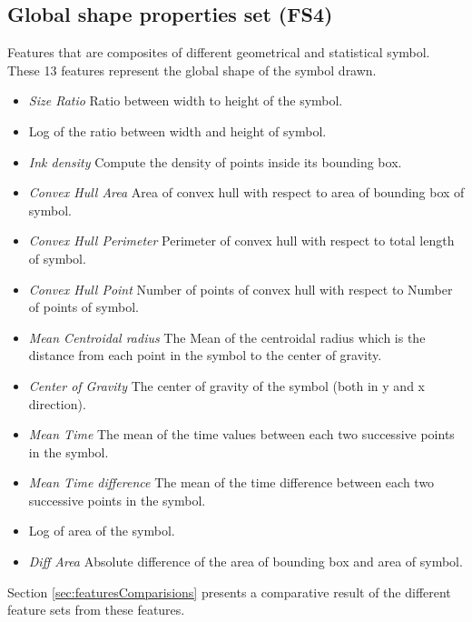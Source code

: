 \subsection{Global shape properties set (FS4)}
 Features that are composites of different geometrical and statistical symbol. These 13 features represent the global shape of the symbol drawn.

 	\begin{itemize}
\item \emph{Size Ratio} Ratio between width to height of the symbol.
		\item {} Log of the ratio between width and height of symbol.
	\item \emph{Ink density} Compute the density of points inside its bounding box\cite{GeometryAndDomain102}.   
 	\item \emph{Convex Hull Area} Area of convex hull with respect to area of bounding box of symbol.
  
	\item \emph{Convex Hull Perimeter} Perimeter of convex hull with respect to total length of symbol.
		\item \emph{Convex Hull Point} Number of points of convex hull with respect to Number of points of symbol.
		\item \emph{Mean Centroidal radius} The Mean of the centroidal radius which is the distance from each point in the symbol to the center of gravity.
				\item \emph{Center of Gravity} The center of gravity of the symbol (both in y and x direction).
					\item \emph{Mean Time} The mean of the time values between each two successive points in the symbol. %
				
	\item \emph{Mean Time difference} The mean of the time difference between each two successive points in the symbol. %
			\item {} Log of area of the symbol.
	\item \emph{Diff Area} Absolute difference of the area of bounding box and area of symbol.
	
  \end{itemize}
  
 Section \ref{sec:featuresComparisions} presents a comparative result of the different feature sets from these features.

